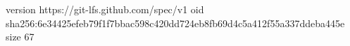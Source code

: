version https://git-lfs.github.com/spec/v1
oid sha256:6e34425efeb79f1f7bbac598c420dd724eb8fb69d4c5a412f55a337ddeba445e
size 67
